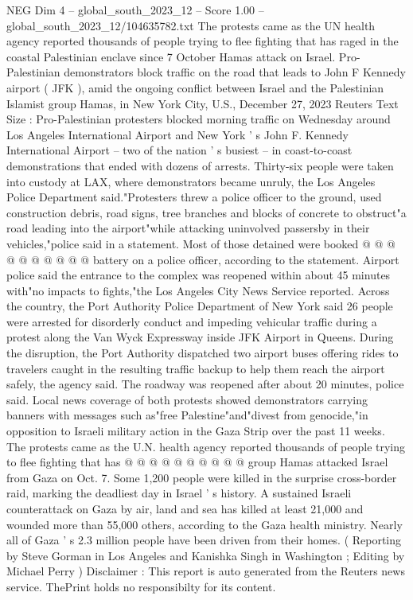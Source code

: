 \begin{textsample}{NEG Dim 4 – global\_south\_2023\_12 – Score 1.00 – global\_south\_2023\_12/104635782.txt}  \label{ex:f4_neg_325}
The protests came as the UN health agency reported thousands of people trying to flee fighting that has raged in the coastal Palestinian enclave since 7 October Hamas attack on Israel.
Pro-Palestinian demonstrators block traffic on the road that leads to John F Kennedy airport ( JFK ), amid the ongoing conflict between Israel and the Palestinian Islamist group Hamas, in New York City, U.S., December 27, 2023 Reuters Text Size : Pro-Palestinian protesters blocked morning traffic on Wednesday around Los Angeles International Airport and New York ' s John F.
Kennedy International Airport -- two of the nation ' s busiest -- in coast-to-coast demonstrations that ended with dozens of arrests.
Thirty-six people were taken into custody at LAX, where demonstrators became unruly, the Los Angeles Police Department said."Protesters threw a police officer to the ground, used construction debris, road signs, tree branches and blocks of concrete to obstruct"a road leading into the airport"while attacking uninvolved passersby in their vehicles,"police said in a statement.
Most of those detained were booked @ @ @ @ @ @ @ @ @ @ battery on a police officer, according to the statement.
Airport police said the entrance to the complex was reopened within about 45 minutes with"no impacts to fights,"the Los Angeles City News Service reported.
Across the country, the Port Authority Police Department of New York said 26 people were arrested for disorderly conduct and impeding vehicular traffic during a protest along the Van Wyck Expressway inside JFK Airport in Queens.
During the disruption, the Port Authority dispatched two airport buses offering rides to travelers caught in the resulting traffic backup to help them reach the airport safely, the agency said.
The roadway was reopened after about 20 minutes, police said.
Local news coverage of both protests showed demonstrators carrying banners with messages such as"free Palestine"and"divest from genocide,"in opposition to Israeli military action in the Gaza Strip over the past 11 weeks.
The protests came as the U.N. health agency reported thousands of people trying to flee fighting that has @ @ @ @ @ @ @ @ @ @ group Hamas attacked Israel from Gaza on Oct. 7.
Some 1,200 people were killed in the surprise cross-border raid, marking the deadliest day in Israel ' s history.
A sustained Israeli counterattack on Gaza by air, land and sea has killed at least 21,000 and wounded more than 55,000 others, according to the Gaza health ministry.
Nearly all of Gaza ' s 2.3 million people have been driven from their homes. ( Reporting by Steve Gorman in Los Angeles and Kanishka Singh in Washington ; Editing by Michael Perry ) Disclaimer : This report is auto generated from the Reuters news service.
ThePrint holds no responsibilty for its content.

\end{textsample}
